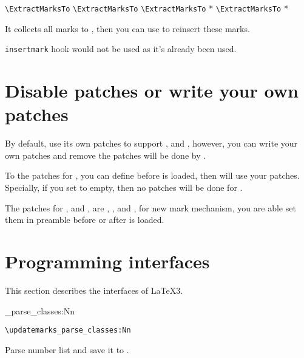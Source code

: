 \documentclass{l3doc}
\begin{document}
\begin{function}[added=2024-02-19]{\ExtractMarksTo}
  \begin{syntax}
    \verb|\ExtractMarksTo|  
    \verb|\ExtractMarksTo|   
    \verb|\ExtractMarksTo| *  
    \verb|\ExtractMarksTo| *   
  \end{syntax}
It collects all marks to , then you can use  to reinsert these marks.

\texttt{insertmark} hook would not be used as it's already been used.
\end{function}

\section{Disable patches or write your own patches}

By default,  use its own patches to support ,
 and , however, you can write your own patches and 
remove the patches will be done by .

To the patches for , you can define 
before  is loaded, then  will use your patches.
Specially, if you set  to empty, then no patches will 
be done for .

The patches for ,  and , 
are , , 
 and \linebreak{},
 for new mark mechanism,
you are able set them in preamble before or after  is loaded.


\section{Programming interfaces}

This section describes the interfaces of \LaTeX3.

\begin{function}[added=2024-02-19]{\updatemarks_parse_classes:Nn}
  \begin{syntax}
    \verb|\updatemarks_parse_classes:Nn|  
  \end{syntax}
Parse number list and save it to .
\end{function}
\end{document}
